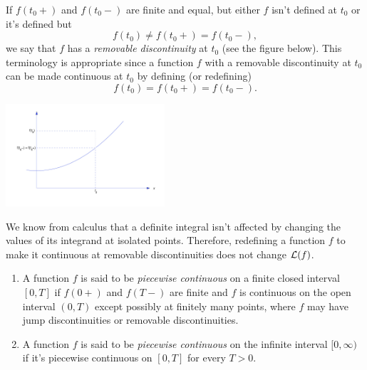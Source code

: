 \documentclass{ximera}
\begin{document}
If $f(t_0+)$ and $f(t_0-)$ are finite and equal, but either $f$ isn't
defined at $t_0$ or it's defined but
$$
f(t_0)\neq f(t_0+)=f(t_0-),
$$
 we say that $f$ has a \textit{removable discontinuity} at $t_0$
(see the figure below).%
This terminology is appropriate since a function $f$  with a removable
discontinuity at $t_0$  can be made continuous at $t_0$ by defining (or
redefining)
$$
f(t_0)=f(t_0+)=f(t_0-).
$$

\begin{image}
 \includegraphics[height=1.5in]{fig080102.jpg}
 \end{image}


\begin{remark}
We know from calculus that a definite integral isn't
affected by changing the values of its integrand at isolated points.
Therefore, redefining a function $f$ to make it continuous at
removable discontinuities does not change ${\cal L}(f)$.
\end{remark}

\begin{definition}\label{thmtype:8.1.4}

\begin{enumerate}
    \item\label{item:8.1.4a} %
A function $f$ is said to be \textit{piecewise continuous} on a finite
closed interval $[0,T]$ if $f(0+)$ and $f(T-)$ are finite and $f$ is
continuous on the open interval $(0,T)$ except possibly at finitely
many points, where $f$ may have jump discontinuities or removable
discontinuities.
\item\label{item:8.1.4b} %
A function $f$ is said to be \textit{piecewise continuous} on the
infinite interval $[0,\infty)$ if it's piecewise continuous on
$[0,T]$ for every $T>0$.
\end{enumerate}
\end{definition}
\end{document}
